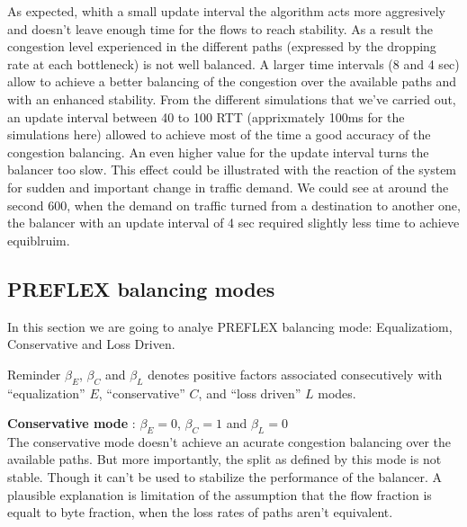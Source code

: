 As expected, whith a small update interval the algorithm acts more aggresively and doesn't leave enough time for the flows to reach stability. As a result the congestion level experienced in the different paths (expressed by the dropping rate at each bottleneck) is not well balanced. A larger time intervals (8 and 4 sec) allow to achieve a better balancing of the congestion over the available paths and with an enhanced stability. From the different simulations that we've carried out, an update interval between 40 to 100 RTT (apprixmately 100ms for the simulations here) allowed to achieve most of the time a good accuracy of the congestion balancing. An even higher value for the update interval turns the balancer too slow. This effect could be illustrated with the reaction of the system for sudden and important change in traffic demand. We could see at around the second 600, when the demand on traffic turned from a destination to another one, the balancer with an update interval of 4 sec required slightly less time to achieve equiblruim.    
 
 \clearpage


\subsection{PREFLEX balancing modes}

In this section we are going to analye PREFLEX balancing mode: Equalizatiom, Conservative and Loss Driven.

Reminder
$\beta_{E}$, $\beta_{C}$ and $\beta_{L}$ denotes positive factors associated consecutively with “equalization” $E$, “conservative” $C$, and “loss driven” $L$ modes.

{\bf Conservative mode} : $\beta_{E}=0$, $\beta_{C}=1$ and $\beta_{L}=0$
\\The conservative mode doesn't achieve an acurate congestion balancing over the available paths. But more importantly, the split as defined by this mode is not stable. Though it can't be used to stabilize the performance of the balancer. A plausible explanation is limitation of the assumption that the flow fraction is equalt to byte fraction, when the loss rates of paths aren't equivalent.

